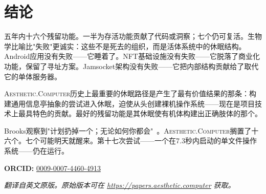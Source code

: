 \documentclass[10pt,letterpaper,twocolumn]{article}
\newcommand{\ac}{\textsc{Aesthetic.Computer}}
\begin{document}
\section{结论}

五年内十六个残留功能。一半为存活功能贡献了代码或洞察；七个仍可复活。生物学比喻比"失败"更诚实：这些不是死去的组织，而是活体系统中的休眠结构。Android应用没有失败——它睡着了。NFT基础设施没有失败——它脱落了商业化功能，保留了寻址方案。Jamsocket架构没有失败——它把内部结构贡献给了取代它的单体服务器。

\ac{}历史上最重要的休眠路径是产生了最有价值结果的那条：构建通用信息亭抽象的尝试进入休眠，迫使从头创建裸机操作系统——现在是项目技术上最具特色的贡献。最好的残留功能是其休眠使有机体构建出正确肢体的那个。

Brooks观察到"计划扔掉一个；无论如何你都会"~\citep{brooks1975mythical}。\ac{}搁置了十六个。七个可能明天就醒来。第十七次尝试——一个在7.3秒内启动的单文件操作系统——仍在运行。

\vspace{0.5em}
\noindent\textbf{ORCID:} \href{https://orcid.org/0009-0007-4460-4913}{0009-0007-4460-4913}

\vspace{0.5em}
\noindent\textit{翻译自英文原版。原始版本可在 \url{https://papers.aesthetic.computer} 获取。}



\end{document}
